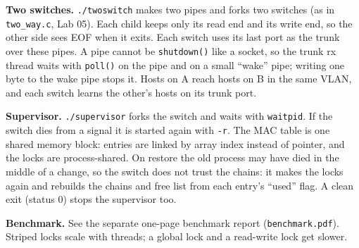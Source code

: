 \documentclass[11pt,a4paper]{article}
\begin{document}
\textbf{Two switches.} \texttt{./twoswitch} makes two pipes and forks two switches
(as in \texttt{two\_way.c}, Lab 05). Each child keeps only its read end and its write
end, so the other side sees EOF when it exits. Each switch uses its last port as the
trunk over these pipes. A pipe cannot be \texttt{shutdown()} like a socket, so the
trunk rx thread waits with \texttt{poll()} on the pipe and on a small ``wake'' pipe;
writing one byte to the wake pipe stops it. Hosts on A reach hosts on B in the same
VLAN, and each switch learns the other's hosts on its trunk port.

\textbf{Supervisor.} \texttt{./supervisor} forks the switch and waits with
\texttt{waitpid}. If the switch dies from a signal it is started again with
\texttt{-r}. The MAC table is one shared memory block: entries are linked by array
index instead of pointer, and the locks are process-shared. On restore the old
process may have died in the middle of a change, so the switch does not trust the
chains: it makes the locks again and rebuilds the chains and free list from each
entry's ``used'' flag. A clean exit (status 0) stops the supervisor too.

\textbf{Benchmark.} See the separate one-page benchmark report (\texttt{benchmark.pdf}).
Striped locks scale with threads; a global lock and a read-write lock get slower.
\end{document}

